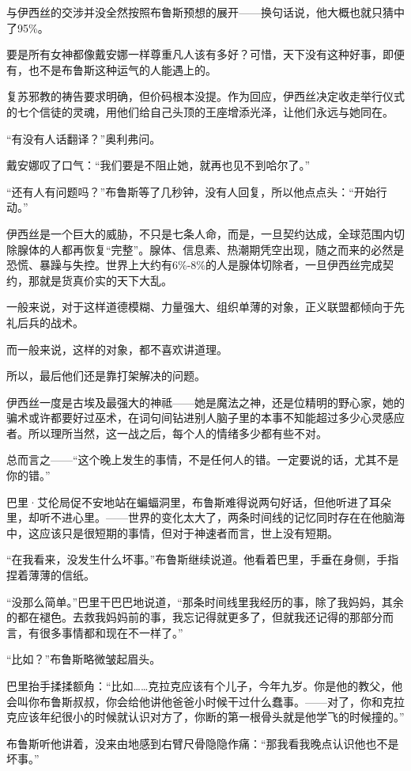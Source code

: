 \documentclass[../main]{subfiles}
\begin{document}
与伊西丝的交涉并没全然按照布鲁斯预想的展开——换句话说，他大概也就只猜中了95\%。

要是所有女神都像戴安娜一样尊重凡人该有多好？可惜，天下没有这种好事，即便有，也不是布鲁斯这种运气的人能遇上的。

复苏邪教的祷告要求明确，但价码根本没提。作为回应，伊西丝决定收走举行仪式的七个信徒的灵魂，用他们给自己头顶的王座增添光泽，让他们永远与她同在。

“有没有人话翻译？”奥利弗问。

戴安娜叹了口气：“我们要是不阻止她，就再也见不到哈尔了。”

“还有人有问题吗？”布鲁斯等了几秒钟，没有人回复，所以他点点头：“开始行动。”

伊西丝是一个巨大的威胁，不只是七条人命，而是，一旦契约达成，全球范围内切除腺体的人都再恢复“完整”。腺体、信息素、热潮期凭空出现，随之而来的必然是恐慌、暴躁与失控。世界上大约有6\%-8\%的人是腺体切除者，一旦伊西丝完成契约，那就是货真价实的天下大乱。

一般来说，对于这样道德模糊、力量强大、组织单薄的对象，正义联盟都倾向于先礼后兵的战术。

而一般来说，这样的对象，都不喜欢讲道理。

所以，最后他们还是靠打架解决的问题。

伊西丝一度是古埃及最强大的神祗——她是魔法之神，还是位精明的野心家，她的骗术或许都要好过巫术，在词句间钻进别人脑子里的本事不知能超过多少心灵感应者。所以理所当然，这一战之后，每个人的情绪多少都有些不对。

总而言之——“这个晚上发生的事情，不是任何人的错。一定要说的话，尤其不是你的错。”

巴里·艾伦局促不安地站在蝙蝠洞里，布鲁斯难得说两句好话，但他听进了耳朵里，却听不进心里。——世界的变化太大了，两条时间线的记忆同时存在在他脑海中，这应该只是很短期的事情，但对于神速者而言，世上没有短期。

“在我看来，没发生什么坏事。”布鲁斯继续说道。他看着巴里，手垂在身侧，手指捏着薄薄的信纸。

“没那么简单。”巴里干巴巴地说道，“那条时间线里我经历的事，除了我妈妈，其余的都在褪色。去救我妈妈前的事，我忘记得就更多了，但就我还记得的那部分而言，有很多事情都和现在不一样了。”

“比如？”布鲁斯略微皱起眉头。

巴里抬手揉揉额角：“比如……克拉克应该有个儿子，今年九岁。你是他的教父，他会叫你布鲁斯叔叔，你会给他讲他爸爸小时候干过什么蠢事。——对了，你和克拉克应该年纪很小的时候就认识对方了，你断的第一根骨头就是他学飞的时候撞的。”

布鲁斯听他讲着，没来由地感到右臂尺骨隐隐作痛：“那我看我晚点认识他也不是坏事。”
\end{document}
